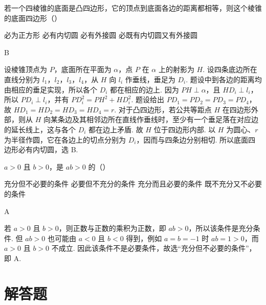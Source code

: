 \documentclass[UTF8,a4paper,oneside,11pt]{ctexbook}
\begin{document}
\begin{problem}

若一个四棱锥的底面是凸四边形，它的顶点到底面各边的距离都相等，则这个棱锥的底面四边形（\quad）

\choices
    {必为正方形}
    {必有内切圆}
    {必有外接圆}
    {必既有内切圆又有外接圆}

\begin{answer}
B
\end{answer}

\begin{solution}
设棱锥顶点为 \(P\)，底面所在平面为 \(\alpha\)，点 \(P\) 在 \(\alpha\) 上的射影为 \(H\). 设四条底边所在直线分别为 \(l_1\)，\(l_2\)，\(l_3\)，\(l_4\)，从 \(H\) 向 \(l_i\) 作垂线，垂足为 \(D_i\). 题设中到各边的距离均由相应的垂足实现，所以各个 \(D_i\) 都在相应的边上. 因为 \(PH\perp\alpha\)，且 \(HD_i\perp l_i\)，所以 \(PD_i\perp l_i\)，并有 \(PD_i^2=PH^2+HD_i^2\). 题设给出 \(PD_1=PD_2=PD_3=PD_4\)，故 \(HD_1=HD_2=HD_3=HD_4=r\). 对于凸四边形，若公共等距点 \(H\) 在四边形外部，则从 \(H\) 向某条边及其相邻边所在直线作垂线时，至少有一个垂足落在对应边的延长线上，这与各个 \(D_i\) 都在边上矛盾. 故 \(H\) 位于四边形内部. 以 \(H\) 为圆心、\(r\) 为半径作圆，它在各边上的切点分别为 \(D_i\)，因而与四条边分别相切. 所以底面四边形必有内切圆，选 B.
\end{solution}
\end{problem}

\begin{problem}

\(a>0\) 且 \(b>0\)，是 \(ab>0\) 的（\quad）

\choices
    {充分但不必要的条件}
    {必要但不充分的条件}
    {充分而且必要的条件}
    {既不充分又不必要的条件}

\begin{answer}
A
\end{answer}

\begin{solution}
若 \(a>0\) 且 \(b>0\)，则正数与正数的乘积为正数，即 \(ab>0\)，所以该条件是充分条件. 但 \(ab>0\) 也可能由 \(a<0\) 且 \(b<0\) 得到，例如 \(a=b=-1\) 时 \(ab=1>0\)，而 \(a>0\) 且 \(b>0\) 不成立. 因此该条件不是必要条件，故选“充分但不必要的条件”，即 A.
\end{solution}
\end{problem}

\section{解答题}
\end{document}
